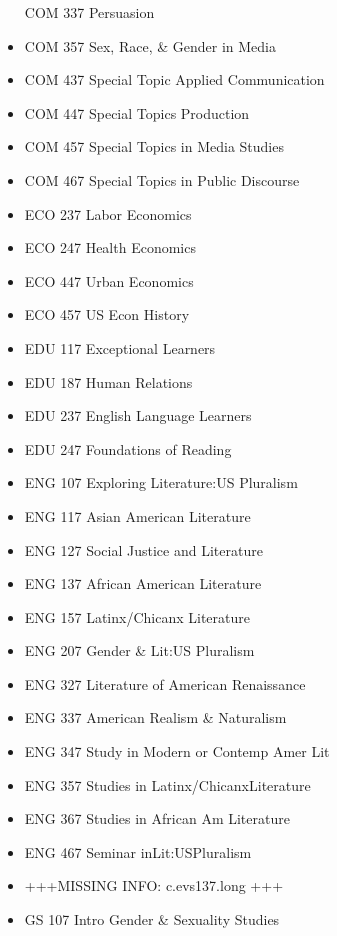 \documentclass[
  letterpaper,
]{scrbook}
\begin{document}
\begin{itemize}
  COM 337 Persuasion\\
\item
  COM 357 Sex, Race, \& Gender in Media
\item
  COM 437 Special Topic Applied Communication
\item
  COM 447 Special Topics Production
\item
  COM 457 Special Topics in Media Studies
\item
  COM 467 Special Topics in Public Discourse
\item
  ECO 237 Labor Economics\\
\item
  ECO 247 Health Economics\\
\item
  ECO 447 Urban Economics\\
\item
  ECO 457 US Econ History\\
\item
  EDU 117 Exceptional Learners\\
\item
  EDU 187 Human Relations\\
\item
  EDU 237 English Language Learners
\item
  EDU 247 Foundations of Reading\\
\item
  ENG 107 Exploring Literature:US Pluralism
\item
  ENG 117 Asian American Literature
\item
  ENG 127 Social Justice and Literature
\item
  ENG 137 African American Literature
\item
  ENG 157 Latinx/Chicanx Literature
\item
  ENG 207 Gender \& Lit:US Pluralism
\item
  ENG 327 Literature of American Renaissance
\item
  ENG 337 American Realism \& Naturalism
\item
  ENG 347 Study in Modern or Contemp Amer Lit
\item
  ENG 357 Studies in Latinx/ChicanxLiterature
\item
  ENG 367 Studies in African Am Literature
\item
  ENG 467 Seminar inLit:USPluralism
\item
  +++MISSING INFO: c.evs137.long +++
\item
  GS 107 Intro Gender \& Sexuality Studies

\end{itemize}
\end{document}
